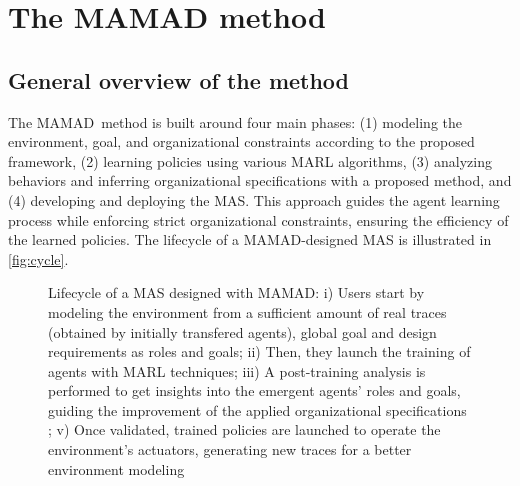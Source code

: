 \documentclass[pdflatex,sn-mathphys-num]{sn-jnl}%
\theoremstyle{thmstyleone}%
\theoremstyle{thmstyletwo}%
\theoremstyle{thmstylethree}%
\begin{document}


\section{The MAMAD method}\label{sec:mamad}

\subsection{General overview of the method}

The MAMAD~\footnotemark[1] method is built around four main phases: (1) modeling the environment, goal, and organizational constraints according to the proposed framework, (2) learning policies using various MARL algorithms, (3) analyzing behaviors and inferring organizational specifications with a proposed method, and (4) developing and deploying the MAS. This approach guides the agent learning process while enforcing strict organizational constraints, ensuring the efficiency of the learned policies. The lifecycle of a MAMAD-designed MAS is illustrated in \autoref{fig:cycle}.

\begin{figure}[h!]
    \centering
    
    \caption{Lifecycle of a MAS designed with MAMAD: i) Users start by modeling the environment from a sufficient amount of real traces (obtained by initially transfered agents), global goal and design requirements as roles and goals; \quad ii) Then, they launch the training of agents with MARL techniques; \quad iii) A post-training analysis is performed to get insights into the emergent agents' roles and goals, guiding the improvement of the applied organizational specifications ; \quad v) Once validated, trained policies are launched to operate the environment's actuators, generating new traces for a better environment modeling}
    \label{fig:cycle}
\end{figure}
\end{document}
